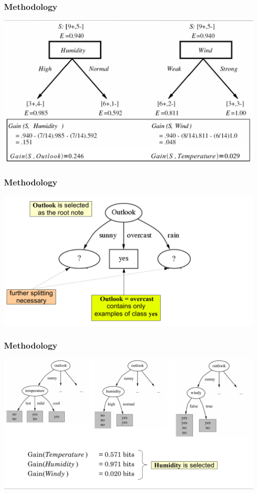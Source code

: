 \documentclass[xcolor={x11names,svgnames,dvipsnames}]{beamer}
\begin{document}
\begin{frame}
\frametitle{Methodology}


      \includegraphics[width=1\textwidth, height=0.7\textheight]{decision_tree4.png}
\end{frame}

\begin{frame}
\frametitle{Methodology}


      \includegraphics[width=1\textwidth, height=0.7\textheight]{decision_tree5.png}
\end{frame}

\begin{frame}
\frametitle{Methodology}


      \includegraphics[width=1\textwidth, height=0.7\textheight]{decision_tree6.png}
\end{frame}
\end{document}
